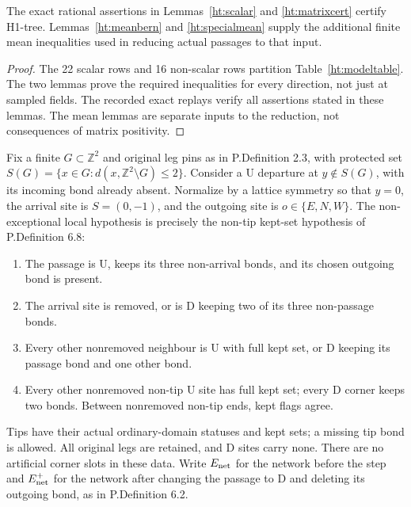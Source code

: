 \begin{htprop}\label{ht:certified}
The exact rational assertions in Lemmas~\ref{ht:scalar} and
\ref{ht:matrixcert} certify H1-tree. Lemmas~\ref{ht:meanbern} and
\ref{ht:specialmean} supply the additional finite mean inequalities
used in reducing actual passages to that input.
\end{htprop}
\begin{proof}
The 22 scalar rows and 16 non-scalar rows partition Table~\ref{ht:modeltable}.
The two lemmas prove the required inequalities for every direction,
not just at sampled fields. The recorded exact replays verify all
assertions stated in these lemmas. The mean lemmas are separate inputs
to the reduction, not consequences of matrix positivity.
\end{proof}

\begin{htdef}\label{ht:actual}
Fix a finite \(G\subset\mathbb Z^2\) and original leg pins as in
P.Definition 2.3, with protected set
\(S(G)=\{x\in G:d(x,\mathbb Z^2\setminus G)\le2\}\).
Consider a U departure at \(y\notin S(G)\), with its incoming bond
already absent. Normalize by a lattice symmetry so that \(y=0\),
the arrival site is \(S=(0,-1)\), and the outgoing site is
\(o\in\{E,N,W\}\). The non-exceptional local hypothesis is precisely
the non-tip kept-set hypothesis of P.Definition 6.8:
\begin{enumerate}
\item The passage is U, keeps its three non-arrival bonds, and its
chosen outgoing bond is present.
\item The arrival site is removed, or is D keeping two of its three
non-passage bonds.
\item Every other nonremoved neighbour is U with full kept set, or
D keeping its passage bond and one other bond.
\item Every other nonremoved non-tip U site has full kept set; every
D corner keeps two bonds. Between nonremoved non-tip ends, kept
flags agree.
\end{enumerate}
Tips have their actual ordinary-domain statuses and kept sets; a missing
tip bond is allowed. All original legs are retained, and D sites carry
none. There are no artificial corner slots in these data.
Write \(E_{\rm net}\) for the network before the step and
\(E_{\rm net}^{+}\) for the network after changing the passage to D
and deleting its outgoing bond, as in P.Definition 6.2.
\end{htdef}

